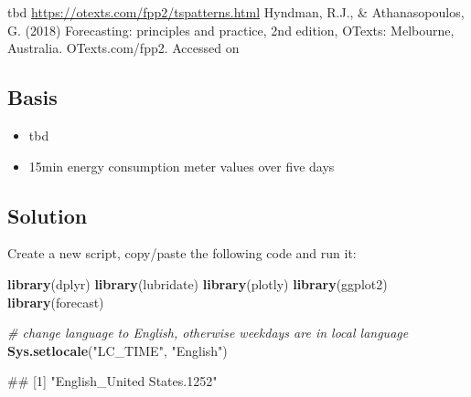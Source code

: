 \documentclass[
]{book}
\newenvironment{Shaded}{\begin{snugshade}}{\end{snugshade}}
\newcommand{\CommentTok}[1]{\textcolor[rgb]{0.56,0.35,0.01}{\textit{#1}}}
\newcommand{\KeywordTok}[1]{\textcolor[rgb]{0.13,0.29,0.53}{\textbf{#1}}}
\newcommand{\NormalTok}[1]{#1}
\newcommand{\StringTok}[1]{\textcolor[rgb]{0.31,0.60,0.02}{#1}}
\providecommand{\tightlist}{%
  \setlength{\itemsep}{0pt}\setlength{\parskip}{0pt}}
\let\oldShaded\Shaded
\let\endoldShaded\endShaded
\renewenvironment{Shaded}{\footnotesize\oldShaded}{\endoldShaded}
\let\oldverbatim\verbatim
\let\endoldverbatim\endverbatim
\renewenvironment{verbatim}{\footnotesize\oldverbatim}{\endoldverbatim}
\begin{document}
tbd
\url{https://otexts.com/fpp2/tspatterns.html}
Hyndman, R.J., \& Athanasopoulos, G. (2018) Forecasting: principles and practice, 2nd edition, OTexts: Melbourne, Australia. OTexts.com/fpp2. Accessed on

\hypertarget{basis-1}{%
\subsection{Basis}\label{basis-1}}

\begin{itemize}
\tightlist
\item
  tbd
\item
  15min energy consumption meter values over five days
\end{itemize}

\hypertarget{solution-5}{%
\subsection{Solution}\label{solution-5}}

Create a new script, copy/paste the following code and run it:

\begin{Shaded}
\begin{Highlighting}[]
\KeywordTok{library}\NormalTok{(dplyr)}
\KeywordTok{library}\NormalTok{(lubridate)}
\KeywordTok{library}\NormalTok{(plotly)}
\KeywordTok{library}\NormalTok{(ggplot2)}
\KeywordTok{library}\NormalTok{(forecast)}

\CommentTok{# change language to English, otherwise weekdays are in local language}
\KeywordTok{Sys.setlocale}\NormalTok{(}\StringTok{"LC_TIME"}\NormalTok{, }\StringTok{"English"}\NormalTok{)}
\end{Highlighting}
\end{Shaded}

\begin{verbatim}
## [1] "English_United States.1252"
\end{verbatim}
\end{document}
